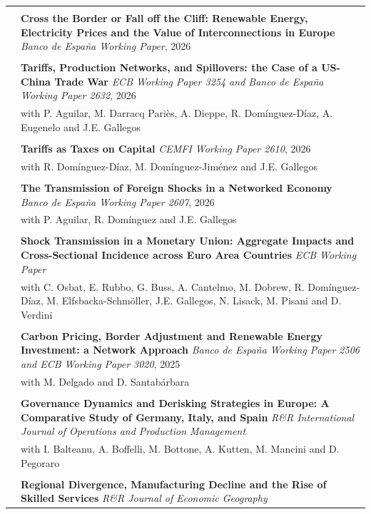 \documentclass[letterpaper, 11pt]{article}
\begin{document}
\begin{longtable}{p{1.3in}p{4.8in}}
& \\
\color{OliveGreen}{Working Papers}
& \textbf{Cross the Border or Fall off the Cliff: Renewable Energy, Electricity Prices and the Value of Interconnections in Europe} \textit{Banco de España Working Paper}, 2026 \\
& \\
& \textbf{Tariffs, Production Networks, and Spillovers: the Case of a US-China Trade War} \textit{ECB Working Paper 3254 and Banco de España Working Paper 2632}, 2026 \\
& with P. Aguilar, M. Darracq Pariès, A. Dieppe, R. Domínguez-Díaz, A. Eugenelo and J.E. Gallegos \\
& \\
& \textbf{Tariffs as Taxes on Capital} \textit{CEMFI Working Paper 2610}, 2026 \\
& with R. Domínguez-Díaz, M. Domínguez-Jiménez and J.E. Gallegos \\
& \\
& \textbf{The Transmission of Foreign Shocks in a Networked Economy} \textit{Banco de España Working Paper 2607}, 2026 \\
& with P. Aguilar, R. Domínguez and J.E. Gallegos \\
& \\
& \textbf{Shock Transmission in a Monetary Union: Aggregate Impacts and Cross-Sectional Incidence across Euro Area Countries} \textit{ECB Working Paper} \\
& with C. Osbat, E. Rubbo, G. Buss, A. Cantelmo, M. Dobrew, R. Domínguez-Díaz, M. Elfsbacka-Schmöller, J.E. Gallegos, N. Lisack, M. Pisani and D. Verdini \\
& \\
& \textbf{Carbon Pricing, Border Adjustment and Renewable Energy Investment: a Network Approach} \textit{Banco de España Working Paper 2506 and ECB Working Paper 3020}, 2025 \\
& with M. Delgado and D. Santabárbara \\
& \\
& \textbf{Governance Dynamics and Derisking Strategies in Europe: A Comparative Study of Germany, Italy, and Spain} \textit{R\&R International Journal of Operations and Production Management} \\
& with I. Balteanu, A. Boffelli, M. Bottone, A. Kutten, M. Mancini and D. Pegoraro \\
& \\
& \textbf{Regional Divergence, Manufacturing Decline and the Rise of Skilled Services} \textit{R\&R Journal of Economic Geography} \\

\end{longtable}
\end{document}
